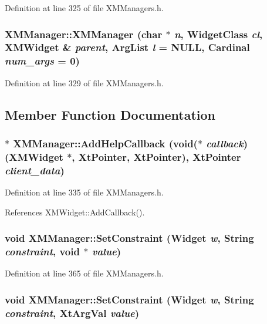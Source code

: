 Definition at line 325 of file XMManagers.h.
\subsubsection{\setlength{\rightskip}{0pt plus 5cm}XMManager::XMManager (char $\ast$ {\em n}, Widget\-Class {\em cl}, {\bf XMWidget} \& {\em parent}, Arg\-List {\em l} = NULL, Cardinal {\em num\_\-args} = 0)\hspace{0.3cm}{\tt  [inline]}}\label{classXMManager_a4}




Definition at line 329 of file XMManagers.h.

\subsection{Member Function Documentation}
\subsubsection{$\ast$ XMManager::Add\-Help\-Callback (void($\ast$ {\em callback})({\bf XMWidget} $\ast$, Xt\-Pointer, Xt\-Pointer), Xt\-Pointer {\em client\_\-data})\hspace{0.3cm}{\tt  [inline]}}\label{classXMManager_a5}




Definition at line 335 of file XMManagers.h.

References XMWidget::Add\-Callback().
\subsubsection{\setlength{\rightskip}{0pt plus 5cm}void XMManager::Set\-Constraint (Widget {\em w}, String {\em constraint}, void $\ast$ {\em value})\hspace{0.3cm}{\tt  [inline]}}\label{classXMManager_a12}




Definition at line 365 of file XMManagers.h.
\subsubsection{\setlength{\rightskip}{0pt plus 5cm}void XMManager::Set\-Constraint (Widget {\em w}, String {\em constraint}, Xt\-Arg\-Val {\em value})\hspace{0.3cm}{\tt  [inline]}}\label{classXMManager_a11}




